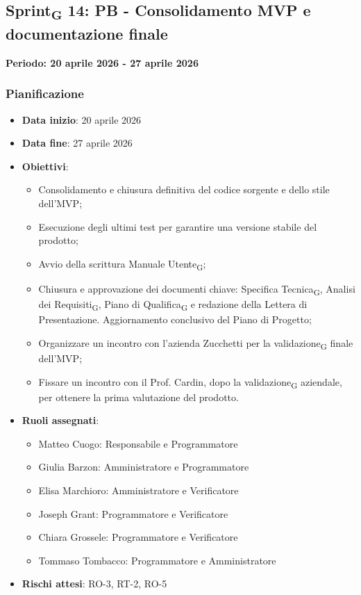 \documentclass[11pt,a4paper]{article}
\newcommand{\gls}[1]{#1\textsubscript{G}}
\begin{document}
\newpage
\subsection{\gls{Sprint} 14: PB - Consolidamento MVP e documentazione finale}
{\textbf{Periodo: 20 aprile 2026 - 27 aprile 2026}\par}

\subsubsection{Pianificazione}
\begin{itemize}
    \item \textbf{Data inizio}: 20 aprile 2026
    \item \textbf{Data fine}: 27 aprile 2026
    \item \textbf{Obiettivi}:
    \begin{itemize}
        \item Consolidamento e chiusura definitiva del codice sorgente e dello stile dell'MVP;
        \item Esecuzione degli ultimi test per garantire una versione stabile del prodotto;
        \item Avvio della scrittura \gls{Manuale Utente};
        \item Chiusura e approvazione dei documenti chiave: \gls{Specifica Tecnica}, \gls{Analisi dei Requisiti}, \gls{Piano di Qualifica} e redazione della Lettera di Presentazione. Aggiornamento conclusivo del Piano di Progetto;
        \item Organizzare un incontro con l'azienda Zucchetti per la \gls{validazione} finale dell'MVP;
        \item Fissare un incontro con il Prof. Cardin, dopo la \gls{validazione} aziendale, per ottenere la prima valutazione del prodotto.
    \end{itemize}
    
    \item \textbf{Ruoli assegnati}:
    \begin{itemize}
        \item Matteo Cuogo: Responsabile e Programmatore
        \item Giulia Barzon: Amministratore e Programmatore
        \item Elisa Marchioro: Amministratore e Verificatore
        \item Joseph Grant: Programmatore e Verificatore
        \item Chiara Grossele: Programmatore e Verificatore
        \item Tommaso Tombacco: Programmatore e Amministratore
    \end{itemize}
    \item \textbf{Rischi attesi}: RO-3, RT-2, RO-5
\end{itemize}
\end{document}
